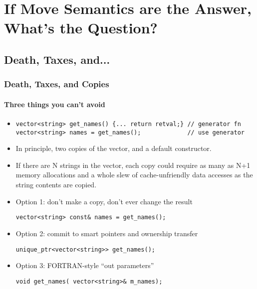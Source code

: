 \lyxframeend{}\section[The Problem]{If Move Semantics are the
Answer, What's the Question?}

\subsection[Problem == Copies]{Death, Taxes, and...}\lyxframeend{}


\begin{frame}[fragile,t]
\frametitle{Death, Taxes, and Copies}
\framesubtitle{Three things you can't avoid}

\begin{itemize}[<+->]

\item{\scriptsize
\begin{verbatim}
vector<string> get_names() {... return retval;} // generator fn
vector<string> names = get_names();             // use generator
\end{verbatim}
}

\item In principle, two copies of the vector, and a default constructor.

\item If there are N strings in the vector, each copy could require as many
as N+1 memory allocations and a whole slew of cache-unfriendly data
accesses as the string contents are copied.


\vskip 12pt
\item Option 1: don't make a copy, don't ever change the result
{\scriptsize
\begin{verbatim}
vector<string> const& names = get_names();
\end{verbatim}
}

\vskip 12pt

\item Option 2: commit to smart pointers and ownership transfer
{\scriptsize
\begin{verbatim}
unique_ptr<vector<string>> get_names();
\end{verbatim}
}
\vskip 12pt

\item Option 3: FORTRAN-style ``out parameters''
{\scriptsize
\begin{verbatim}
void get_names( vector<string>& m_names);
\end{verbatim}
}


\end{itemize}

\end{frame}

